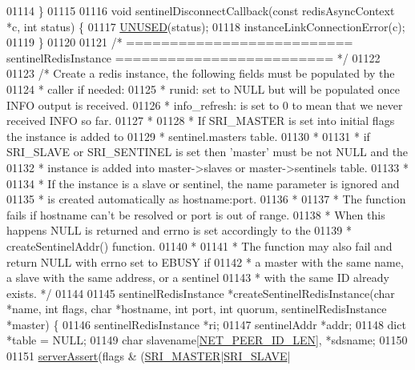 \begin{DoxyCode}
{{{{{{{{{{{{{{{{01114 \}
01115 
01116 \textcolor{keywordtype}{void} sentinelDisconnectCallback(\textcolor{keyword}{const} redisAsyncContext *c, \textcolor{keywordtype}{int} status) \{
01117     \hyperlink{server_8h_ae7c9dc8f13568a9c856573751f1ee1ec}{UNUSED}(status);
01118     instanceLinkConnectionError(c);
01119 \}
01120 
01121 \textcolor{comment}{/* ========================== sentinelRedisInstance ========================= */}
01122 
01123 \textcolor{comment}{/* Create a redis instance, the following fields must be populated by the}
01124 \textcolor{comment}{ * caller if needed:}
01125 \textcolor{comment}{ * runid: set to NULL but will be populated once INFO output is received.}
01126 \textcolor{comment}{ * info\_refresh: is set to 0 to mean that we never received INFO so far.}
01127 \textcolor{comment}{ *}
01128 \textcolor{comment}{ * If SRI\_MASTER is set into initial flags the instance is added to}
01129 \textcolor{comment}{ * sentinel.masters table.}
01130 \textcolor{comment}{ *}
01131 \textcolor{comment}{ * if SRI\_SLAVE or SRI\_SENTINEL is set then 'master' must be not NULL and the}
01132 \textcolor{comment}{ * instance is added into master->slaves or master->sentinels table.}
01133 \textcolor{comment}{ *}
01134 \textcolor{comment}{ * If the instance is a slave or sentinel, the name parameter is ignored and}
01135 \textcolor{comment}{ * is created automatically as hostname:port.}
01136 \textcolor{comment}{ *}
01137 \textcolor{comment}{ * The function fails if hostname can't be resolved or port is out of range.}
01138 \textcolor{comment}{ * When this happens NULL is returned and errno is set accordingly to the}
01139 \textcolor{comment}{ * createSentinelAddr() function.}
01140 \textcolor{comment}{ *}
01141 \textcolor{comment}{ * The function may also fail and return NULL with errno set to EBUSY if}
01142 \textcolor{comment}{ * a master with the same name, a slave with the same address, or a sentinel}
01143 \textcolor{comment}{ * with the same ID already exists. */}
01144 
01145 sentinelRedisInstance *createSentinelRedisInstance(\textcolor{keywordtype}{char} *name, \textcolor{keywordtype}{int} flags, \textcolor{keywordtype}{char} *hostname, \textcolor{keywordtype}{int} port, \textcolor{keywordtype}{
      int} quorum, sentinelRedisInstance *master) \{
01146     sentinelRedisInstance *ri;
01147     sentinelAddr *addr;
01148     dict *table = NULL;
01149     \textcolor{keywordtype}{char} slavename[\hyperlink{server_8h_a39a30f77e23c1994e70b6c9bc892dee9}{NET\_PEER\_ID\_LEN}], *sdsname;
01150 
01151     \hyperlink{server_8h_a88114b5169b4c382df6b56506285e56a}{serverAssert}(flags & (\hyperlink{sentinel_8c_a2ee83e5ff67b45746cd6a310f15334b2}{SRI\_MASTER}|\hyperlink{sentinel_8c_a4b9db21eda79d49bd9fdf2cf7b3178e8}{SRI\_SLAVE}|
}}}}}}}}}}}}}}}}
\end{DoxyCode}
